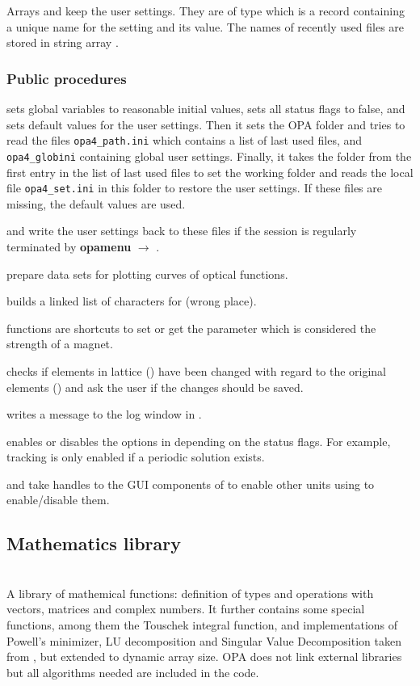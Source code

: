 \documentclass[12pt]{article}
\newcommand\code[1]{{\tt #1}}
\newcommand{\ofld}[1]{\colorbox{black!15}{{{\color{black}\bf #1}}}}
\newcommand\guico[1]{{\color{blue}\code{#1}}}
\newcommand{\unico}[1]{{\color{burntorange}\code{#1}}}
\newcommand{\evcod}[2]{\ofld{#1} $\rightarrow$ \guico{#2}}
\newcommand{\opagui}[1]{\colorbox{blue!20}{{\color{black}\code{#1}}}}
\newcommand{\ogui}[1]{\hyperref[#1]{\opagui{#1}}}
\newcommand{\opauni}[1]{\colorbox{orange!30}{{\color{black}\code{#1}}}}
\newcommand{\ounih}[2]{\subsection{\label{#2}#1}{\Huge\opauni{#2}}\\}
\newcommand{\ouni}[1]{\hyperref[#1]{\opauni{#1}}}
\newcommand{\desc}[1]{#1}
\newcommand{\ppro}[1]{\subsubsection*{Public procedures} #1}
\newcommand{\todo}[1]{{\color{red} #1}}
\begin{document}
Arrays \unico{GlobDef} and \unico{Def} keep the user settings. They are of type \unico{DefaultType} which is a record containing a unique name for the setting and its value. The names of recently  used files are stored in string array \unico{LastUsedFiles}. 


\ppro{

\unico{Initialization} sets global variables to reasonable initial values, sets all status flags to false, and sets default values for the user settings.
Then it sets the OPA folder and tries to read the files \code{opa4\_path.ini} which contains a list of last used files, and \code{opa4\_glob\.ini} containing global user settings. Finally, it takes the folder from the first entry in the list of last used files to set the working folder and reads the local file \code{opa4\_set.ini} in this folder to restore the user settings. If these files are missing, the default values are used.

\unico{GlobDefWriteFile} and \unico{DefWriteFile} write the user settings back to these files if the session is regularly terminated by \evcod{opamenu}{ExitOPA}.

\unico{AppendCurve, ClearCurve}  prepare data sets for plotting curves of optical functions. 

\unico{AppendChar} builds a linked list of characters for \ogui{opatexteditor} \todo{(wrong place)}.

\unico{putkval, getkval, putSexkval, getSexkval} functions are shortcuts to set or get the parameter which is considered the strength of a magnet.

\unico{EllaSave} checks if elements in lattice (\unico{Ella}) have been changed with regard to the original elements (\unico{Elem}) and ask the user if the changes should be saved.

\unico{OPALog} writes a message to the log window in \ogui{opamenu}.

\unico{MainButtonEnable} enables or disables the options in \ogui{opamenu} depending on the status flags. For example, tracking is only enabled if a periodic solution exists.

\unico{PassMainButtonHandles} and \unico{passErrLogHandle} take handles to the GUI components of \ogui{opamenu} to enable other units using \ouni{globlib} to enable/disable them.
}





\ounih{Mathematics library}{mathlib}

\desc{
A library of mathemical functions: definition of types and operations with vectors, matrices and complex numbers. It further contains some special functions, among them the Touschek integral function, and implementations of Powell's minimizer, LU decomposition and Singular Value Decomposition taken from \cite{numrec}, but extended to dynamic array size. OPA does not link external libraries but all algorithms needed are included in the code.}
\end{document}
